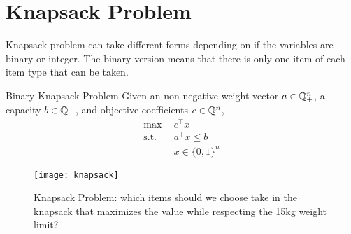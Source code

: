\documentclass[../open-optimization/open-optimization.tex]{subfiles}
\begin{document}
\section{Knapsack Problem}
Knapsack problem can take different forms depending on if the variables are binary or integer.  The binary version means that there is only one item of each item type that can be taken.
\begin{general}{Binary Knapsack Problem}{\npcomplete}
Given an non-negative weight vector $a \in {\mathbb{Q}}^n_+$, a capacity $b \in {\mathbb{Q}}_+$, and objective coefficients $c \in {\mathbb{Q}}^n$, 
\begin{equation}
\begin{split}
\max \ \ & c^\top x\\
\text{s.t.}\ \ & a^\top x \leq b\\
& x \in \{0,1\}^n
\end{split}
\end{equation}
\end{general}
\begin{figure}[H]
\begin{center}
\texttt{[image: knapsack]}\footnotemark \end{center}
\label{fig:knapsack}
\caption{Knapsack Problem: which items should we choose take in the knapsack that maximizes the value while respecting the 15kg weight limit?}
\end{figure}
\end{document}
